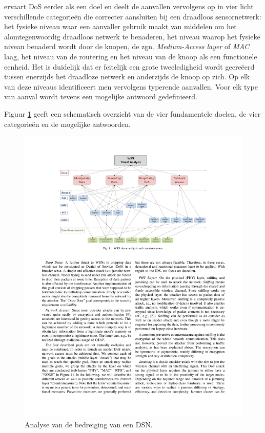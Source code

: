 \citep{aschenbruck2012security} ervaart DoS eerder als een doel en deelt de
aanvallen vervolgens op in vier licht verschillende categorie\"en die correcter
aansluiten bij een draadloos sensornetwerk: het fysieke niveau waar een
aanvaller gebruik maakt van middelen om het alomtegenwoordig draadloos netwerk
te benaderen, het niveau waarop het fysieke niveau benaderd wordt door de
knopen, de zgn. \emph{Medium-Access layer} of \emph{MAC} laag, het niveau van
de routering en het niveau van de knoop als een functionele eenheid. Het is
duidelijk dat er feitelijk een grote tweeledigheid wordt gecre\"eerd tussen
enerzijds het draadloze netwerk en anderzijds de knoop op zich. Op elk van deze
niveaus identificeert men vervolgens typerende aanvallen. Voor elk type van
aanval wordt tevens een mogelijke antwoord gedefinieerd.

Figuur \ref{fig:wsn-threat-analysis} geeft een schematisch overzicht van de
vier fundamentele doelen, de vier categorie\"en en de mogelijke antwoorden.

\begin{figure}[ht]
  \centering
  \includegraphics[width=0.9\linewidth]{resources/wsn-threat-analysis.pdf}
  \caption{Analyse van de bedreiging van een DSN.}
  \label{fig:wsn-threat-analysis}
\end{figure}

